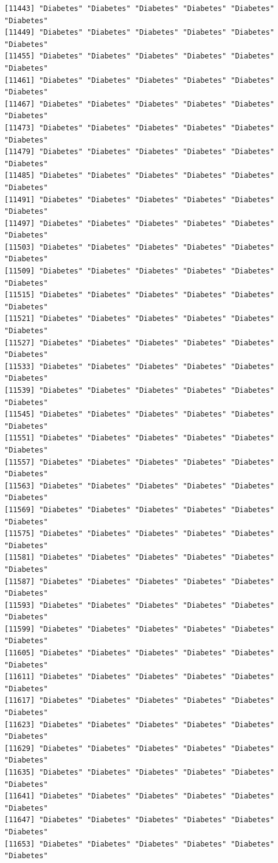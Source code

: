 \documentclass[
  letterpaper,
  DIV=11,
  numbers=noendperiod]{scrartcl}
\begin{document}
\begin{verbatim}
[11443] "Diabetes" "Diabetes" "Diabetes" "Diabetes" "Diabetes" "Diabetes"
[11449] "Diabetes" "Diabetes" "Diabetes" "Diabetes" "Diabetes" "Diabetes"
[11455] "Diabetes" "Diabetes" "Diabetes" "Diabetes" "Diabetes" "Diabetes"
[11461] "Diabetes" "Diabetes" "Diabetes" "Diabetes" "Diabetes" "Diabetes"
[11467] "Diabetes" "Diabetes" "Diabetes" "Diabetes" "Diabetes" "Diabetes"
[11473] "Diabetes" "Diabetes" "Diabetes" "Diabetes" "Diabetes" "Diabetes"
[11479] "Diabetes" "Diabetes" "Diabetes" "Diabetes" "Diabetes" "Diabetes"
[11485] "Diabetes" "Diabetes" "Diabetes" "Diabetes" "Diabetes" "Diabetes"
[11491] "Diabetes" "Diabetes" "Diabetes" "Diabetes" "Diabetes" "Diabetes"
[11497] "Diabetes" "Diabetes" "Diabetes" "Diabetes" "Diabetes" "Diabetes"
[11503] "Diabetes" "Diabetes" "Diabetes" "Diabetes" "Diabetes" "Diabetes"
[11509] "Diabetes" "Diabetes" "Diabetes" "Diabetes" "Diabetes" "Diabetes"
[11515] "Diabetes" "Diabetes" "Diabetes" "Diabetes" "Diabetes" "Diabetes"
[11521] "Diabetes" "Diabetes" "Diabetes" "Diabetes" "Diabetes" "Diabetes"
[11527] "Diabetes" "Diabetes" "Diabetes" "Diabetes" "Diabetes" "Diabetes"
[11533] "Diabetes" "Diabetes" "Diabetes" "Diabetes" "Diabetes" "Diabetes"
[11539] "Diabetes" "Diabetes" "Diabetes" "Diabetes" "Diabetes" "Diabetes"
[11545] "Diabetes" "Diabetes" "Diabetes" "Diabetes" "Diabetes" "Diabetes"
[11551] "Diabetes" "Diabetes" "Diabetes" "Diabetes" "Diabetes" "Diabetes"
[11557] "Diabetes" "Diabetes" "Diabetes" "Diabetes" "Diabetes" "Diabetes"
[11563] "Diabetes" "Diabetes" "Diabetes" "Diabetes" "Diabetes" "Diabetes"
[11569] "Diabetes" "Diabetes" "Diabetes" "Diabetes" "Diabetes" "Diabetes"
[11575] "Diabetes" "Diabetes" "Diabetes" "Diabetes" "Diabetes" "Diabetes"
[11581] "Diabetes" "Diabetes" "Diabetes" "Diabetes" "Diabetes" "Diabetes"
[11587] "Diabetes" "Diabetes" "Diabetes" "Diabetes" "Diabetes" "Diabetes"
[11593] "Diabetes" "Diabetes" "Diabetes" "Diabetes" "Diabetes" "Diabetes"
[11599] "Diabetes" "Diabetes" "Diabetes" "Diabetes" "Diabetes" "Diabetes"
[11605] "Diabetes" "Diabetes" "Diabetes" "Diabetes" "Diabetes" "Diabetes"
[11611] "Diabetes" "Diabetes" "Diabetes" "Diabetes" "Diabetes" "Diabetes"
[11617] "Diabetes" "Diabetes" "Diabetes" "Diabetes" "Diabetes" "Diabetes"
[11623] "Diabetes" "Diabetes" "Diabetes" "Diabetes" "Diabetes" "Diabetes"
[11629] "Diabetes" "Diabetes" "Diabetes" "Diabetes" "Diabetes" "Diabetes"
[11635] "Diabetes" "Diabetes" "Diabetes" "Diabetes" "Diabetes" "Diabetes"
[11641] "Diabetes" "Diabetes" "Diabetes" "Diabetes" "Diabetes" "Diabetes"
[11647] "Diabetes" "Diabetes" "Diabetes" "Diabetes" "Diabetes" "Diabetes"
[11653] "Diabetes" "Diabetes" "Diabetes" "Diabetes" "Diabetes" "Diabetes"

\end{verbatim}
\end{document}
